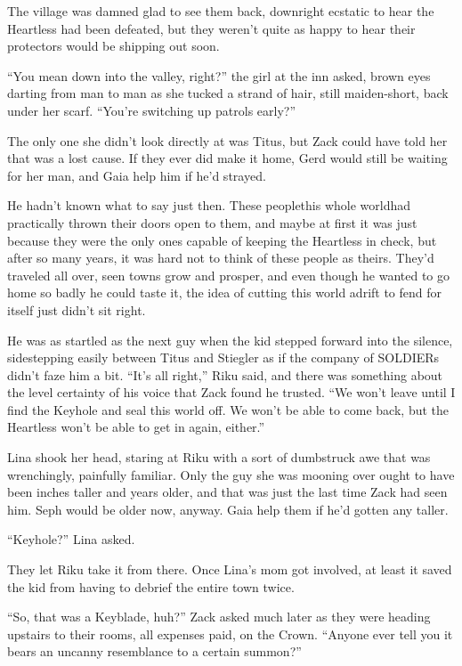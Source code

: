 \renewcommand{\pfbreakdisplay}{%
\ding{66}\quad\ding{66}\quad\ding{66}}

The village was damned glad to see them back, downright ecstatic to hear the Heartless had been defeated, but they weren't quite as happy to hear their protectors would be shipping out soon.

``You mean down into the valley, right?'' the girl at the inn asked, brown eyes darting from man to man as she tucked a strand of hair, still maiden-short, back under her scarf. ``You're switching up patrols early?''

The only one she didn't look directly at was Titus, but Zack could have told her that was a lost cause. If they ever did make it home, Gerd would still be waiting for her man, and Gaia help him if he'd strayed.

He hadn't known what to say just then. These people\textemdash this whole world\textemdash had practically thrown their doors open to them, and maybe at first it was just because they were the only ones capable of keeping the Heartless in check, but after so many years, it was hard not to think of these people as theirs. They'd traveled all over, seen towns grow and prosper, and even though he wanted to go home so badly he could taste it, the idea of cutting this world adrift to fend for itself just didn't sit right.

He was as startled as the next guy when the kid stepped forward into the silence, sidestepping easily between Titus and Stiegler as if the company of SOLDIERs didn't faze him a bit. ``It's all right,'' Riku said, and there was something about the level certainty of his voice that Zack found he trusted. ``We won't leave until I find the Keyhole and seal this world off. We won't be able to come back, but the Heartless won't be able to get in again, either.''

Lina shook her head, staring at Riku with a sort of dumbstruck awe that was wrenchingly, painfully familiar. Only the guy she was mooning over ought to have been inches taller and years older, and that was just the last time Zack had seen him. Seph would be older now, anyway. Gaia help them if he'd gotten any taller.

``Keyhole?'' Lina asked.

They let Riku take it from there. Once Lina's mom got involved, at least it saved the kid from having to debrief the entire town twice.

``So, that was a Keyblade, huh?'' Zack asked much later as they were heading upstairs to their rooms, all expenses paid, on the Crown. ``Anyone ever tell you it bears an uncanny resemblance to a certain summon?''

